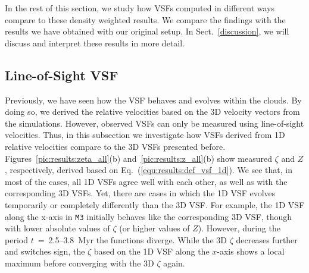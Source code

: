 In the rest of this section, we study how VSFs 
    computed in different ways compare to these density weighted results.
We compare the findings with the results we have obtained with our original setup.
In Sect.~\ref{discussion}, we will discuss and interpret these results in more detail.


\subsection{Line-of-Sight VSF}\label{results:1d}

Previously, we have seen how the VSF behaves and evolves within the clouds.
By doing so, we derived the relative velocities based on the 3D velocity vectors 
from the simulations.
    However, observed VSFs can only be measured using line-of-sight velocities.
Thus, in this subsection we investigate how VSFs derived from 1D relative velocities compare to the 3D VSFs presented before.
Figures~\ref{pic:results:zeta_all}(b) and~\ref{pic:results:z_all}(b) show measured $\zeta$ and $Z$, respectively, derived based on Eq.~(\ref{equ:results:def_vsf_1d}). 
We see that, in most of the cases, all 1D VSFs agree well with each other, as well as with the corresponding 3D VSFs.
Yet, there are cases in which the 1D VSF evolves temporarily or completely differently than the 3D VSF.
For example, the 1D VSF along the x-axis in \texttt{M3} initially behaves like the corresponding 3D VSF, though with lower absolute values of $\zeta$ (or higher values of $Z$).
However, during the period $t$~=~2.5--3.8~Myr the functions diverge. 
While the 3D $\zeta$ 
    decreases 
further and switches sign, the $\zeta$ based on the 1D VSF along the $x$-axis shows a local maximum before converging with the 3D $\zeta$ again. 


